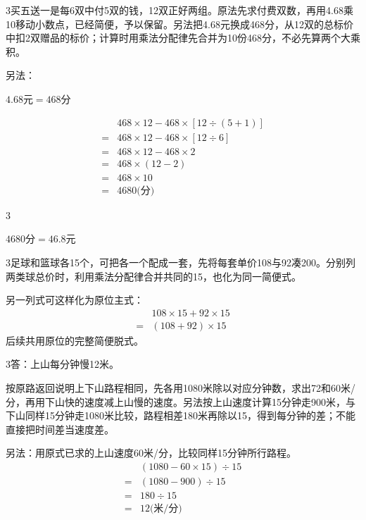 \documentclass[multi=snippet,border={5bp 20bp 5bp 5bp}]{standalone}
\newenvironment{snippet}[3]{\begin{minipage}{#1bp}\color{answerred}\fontsize{#2}{#3}\selectfont\raggedright}{\end{minipage}}
\begin{document}
\begin{snippet}{505}{11.5}{14}\begin{multicols}{3}\raggedcolumns 买五送一是每6双中付5双的钱，12双正好两组。原法先求付费双数，再用4.68乘10移动小数点，已经简便，予以保留。另法把4.68元换成468分，从12双的总标价中扣2双赠品的标价；计算时用乘法分配律先合并为10份468分，不必先算两个大乘积。\par 另法：\par\noindent\(\displaystyle 4.68\text{元}=468\text{分}\)\allowbreak \par \noindent\end{multicols}\[\displaystyle \begin{aligned}&468\times12-468\times[12\div(5+1)]\\={}&468\times12-468\times[12\div6]\\={}&468\times12-468\times2\\={}&468\times(12-2)\\={}&468\times10\\={}&4680\text{(分)}\end{aligned}\]\begin{multicols}{3}\raggedcolumns \par \noindent\(\displaystyle 4680\text{分}=46.8\text{元}\)\allowbreak \par\end{multicols}\end{snippet}
\begin{snippet}{505}{11.5}{14}\begin{multicols}{3}\raggedcolumns 足球和篮球各15个，可把各一个配成一套，先将每套单价108与92凑200。分别列两类球总价时，利用乘法分配律合并共同的15，也化为同一简便式。\par 另一列式可这样化为原位主式：\[\begin{aligned}&108\times15+92\times15\\={}&(108+92)\times15\end{aligned}\]后续共用原位的完整简便脱式。\end{multicols}\end{snippet}
\begin{snippet}{505}{11.5}{14}\begin{multicols}{3}\raggedcolumns 答：上山每分钟慢12米。\par 按原路返回说明上下山路程相同，先各用1080米除以对应分钟数，求出72和60米/分，再用下山快的速度减上山慢的速度。另法按上山速度计算15分钟走900米，与下山同样15分钟走1080米比较，路程相差180米再除以15，得到每分钟的差；不能直接把时间差当速度差。\par 另法：用原式已求的上山速度60米/分，比较同样15分钟所行路程。\[\begin{aligned} &(1080-60\times15)\div15\\={}&(1080-900)\div15\\={}&180\div15\\={}&12\text{(米/分)}\end{aligned}\]\end{multicols}\end{snippet}
\end{document}
